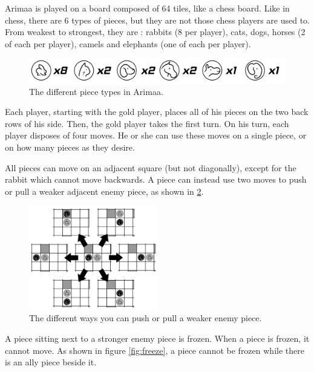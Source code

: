 Arimaa is played on a board composed of 64 tiles, like a chess board. Like in chess, there are 6 types of pieces, but they are not those chess players are used to. From weakest to strongest, they are : rabbits (8 per player), cats, dogs, horses (2 of each per player), camels and elephants (one of each per player).

\begin{figure}[!h]
\centering
\includegraphics[width=\textwidth]{1_Presentation/1.1_Arimaa_rules_Gabriel/Pictures/Pieces.png}
\caption{\label{fig:pieces}The different piece types in Arimaa.}
\end{figure}

Each player, starting with the gold player, places all of his pieces on the two back rows of his side. Then, the gold player takes the first turn.
On his turn, each player disposes of four moves. He or she can use these moves on a single piece, or on how many pieces as they desire.

All pieces can move on an adjacent square (but not diagonally), except for the rabbit which cannot move backwards.
A piece can instead use two moves to push or pull a weaker adjacent enemy piece, as shown in \ref{fig:displace}.

\begin{figure}[!h]
\centering
\includegraphics[width=0.5\textwidth]{1_Presentation/1.1_Arimaa_rules_Gabriel/Pictures/Displace.png}
\caption{\label{fig:displace}The different ways you can push or pull a weaker enemy piece.}
\end{figure}

A piece sitting next to a stronger enemy piece is frozen. When a piece is frozen, it cannot move. As shown in figure \ref{fig:freeze}, a piece cannot be frozen while there is an ally piece beside it.

